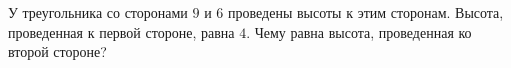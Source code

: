 \begin{ex}
	\begin{condition}
		У треугольника со сторонами \( 9 \) и \( 6  \) проведены высоты к этим сторонам. Высота, проведенная к первой стороне, равна \( 4 \). Чему равна высота, проведенная ко второй стороне?
	\end{condition}
\end{ex}